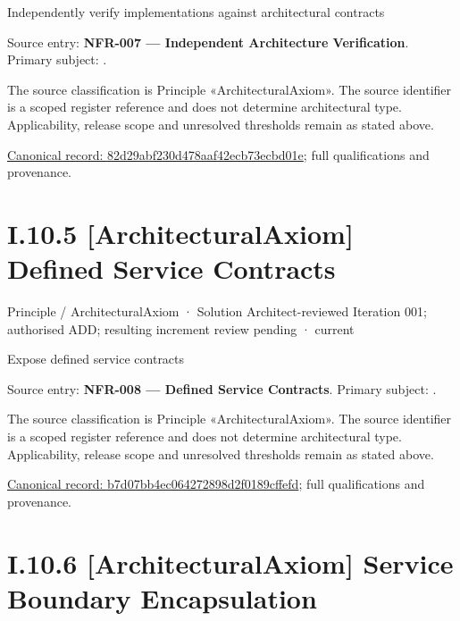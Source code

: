 Independently verify implementations against architectural contracts



Source entry: \textbf{NFR-007 — Independent Architecture Verification}. Primary subject: \texttt{}.



The source classification is Principle «ArchitecturalAxiom». The source identifier is a scoped register reference and does not determine architectural type. Applicability, release scope and unresolved thresholds remain as stated above.


{\footnotesize \href{../../../../../../../continuum/motivation/principle/architectural-axiom/82d29abf230d478aaf42ecb73ecbd01e.md}{Canonical record: 82d29abf230d478aaf42ecb73ecbd01e}; full qualifications and provenance.}\par
\section*{I.10.5 [ArchitecturalAxiom] Defined Service Contracts}
\label{navigation:I.10.5}

\label{element:b7d07bb4ec064272898d2f0189cffefd}
{\small Principle / ArchitecturalAxiom · Solution Architect-reviewed Iteration 001; authorised ADD; resulting increment review pending · current}\par

Expose defined service contracts



Source entry: \textbf{NFR-008 — Defined Service Contracts}. Primary subject: \texttt{}.



The source classification is Principle «ArchitecturalAxiom». The source identifier is a scoped register reference and does not determine architectural type. Applicability, release scope and unresolved thresholds remain as stated above.


{\footnotesize \href{../../../../../../../continuum/motivation/principle/architectural-axiom/b7d07bb4ec064272898d2f0189cffefd.md}{Canonical record: b7d07bb4ec064272898d2f0189cffefd}; full qualifications and provenance.}\par
\section*{I.10.6 [ArchitecturalAxiom] Service Boundary Encapsulation}
\label{navigation:I.10.6}

